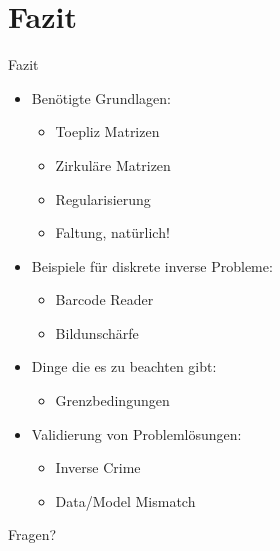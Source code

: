\documentclass[11pt]{beamer}
\begin{document}
\section{Fazit}
\begin{frame}{Fazit}
\begin{itemize}
\item Benötigte Grundlagen:
\pause
  \begin{itemize}
  \item Toepliz Matrizen
  \pause
  \item Zirkuläre Matrizen
  \pause
  \item Regularisierung
  \pause
  \item Faltung, natürlich!
  \pause
  \end{itemize}
\item Beispiele für diskrete inverse Probleme:
\pause
  \begin{itemize}
  \item Barcode Reader
  \pause
  \item Bildunschärfe
  \pause
  \end{itemize}
\item Dinge die es zu beachten gibt:
\pause
  \begin{itemize}
  \item Grenzbedingungen
  \pause
  \end{itemize}
\item Validierung von Problemlösungen:
\pause
  \begin{itemize}
  \item Inverse Crime
  \pause
  \item Data/Model Mismatch
  \end{itemize}
\end{itemize}
\end{frame}


\begin{frame}
\begin{center}
Fragen?
\end{center}
\end{frame}
\end{document}
